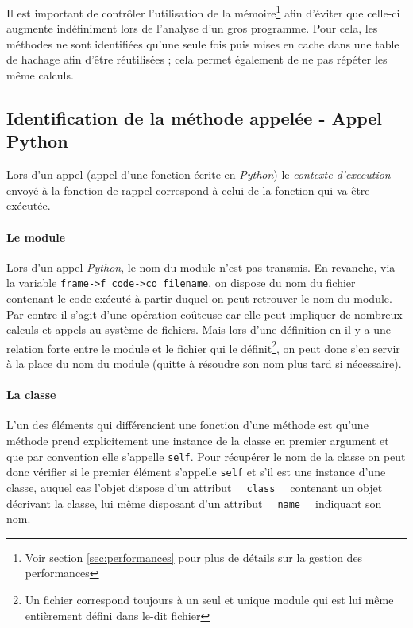 \begin{note}[Performances]
Il est important de contrôler l'utilisation de la mémoire\footnote{Voir section \vref{sec:performances} pour plus de détails sur la gestion des performances} afin d'éviter que celle-ci augmente indéfiniment lors de l'analyse d'un gros programme. Pour cela, les méthodes ne sont identifiées qu'une seule fois puis mises en cache dans une table de hachage afin d'être réutilisées ; cela permet également de ne pas répéter les même calculs.
\end{note}

\subsection{Identification de la méthode appelée - Appel Python}
\label{ident-python}
Lors d'un appel \Python (appel d'une fonction écrite en \emph{Python}) le \emph{\gls{contexte d'execution}} envoyé à la fonction de rappel correspond à celui de la fonction qui va être exécutée.

\paragraph*{Le module} Lors d'un appel \emph{Python}, le nom du module n'est pas transmis. En revanche,  via la variable \verb|frame->f_code->co_filename|, on dispose du nom du fichier contenant le code exécuté à partir duquel on peut retrouver le nom du module. Par contre il s'agit d'une opération coûteuse car elle peut impliquer de nombreux calculs et appels au système de fichiers. Mais lors d'une définition en \Python il y a une relation forte entre le module et le fichier qui le définit\footnote{Un fichier correspond toujours à un seul et unique module qui est lui même entièrement défini dans le-dit fichier}, on peut donc s'en servir à la place du nom du module (quitte à résoudre son nom plus tard si nécessaire).

\paragraph*{La classe} L'un des éléments qui différencient une fonction d'une méthode est qu'une méthode prend explicitement une instance de la classe en premier argument et que par convention elle s'appelle \verb|self|. Pour récupérer le nom de la classe on peut donc vérifier si le premier élément s'appelle \verb|self| et s'il est une instance d'une classe, auquel cas l'objet dispose d'un attribut \verb|__class__| contenant un objet décrivant la classe, lui même disposant d'un attribut \verb|__name__| indiquant son nom.

